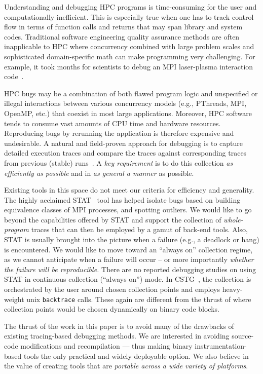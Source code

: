 Understanding and debugging HPC programs 
is time-consuming for the user and computationally inefficient.
%
This is especially true when one has to 
track control flow in terms of function calls and returns that may
span library and system codes. 
%
Traditional software engineering quality assurance methods are 
often inapplicable to HPC where concurrency combined with 
large problem scales and sophisticated domain-specific math can make programming 
very challenging. 
%
For example, it took months for scientists to debug an MPI laser-plasma interaction 
code~\cite{hpcdoe}.


HPC bugs may be a combination of both flawed program logic and unspecified or illegal interactions between various concurrency models (e.g., PThreads, MPI, OpenMP, etc.) that coexist in most large applications. Moreover, HPC software tends to consume vast amounts of CPU time and hardware resources. Reproducing bugs by rerunning the application is therefore expensive and undesirable. 
A natural and field-proven approach for debugging is to capture detailed execution traces and compare the traces against corresponding traces from previous (stable) runs~\cite{stat,cstg}.
%
A {\em key requirement} is to do this collection {\em as efficiently as possible}
and in {\em as general a manner} as possible.


Existing tools in this space
do not meet our criteria for efficiency and generality.
%
The highly acclaimed STAT~\cite{stat} tool has helped isolate
bugs based on building equivalence classes of MPI processes, and spotting
outliers.
%
We would like to go beyond the capabilities offered by STAT and support
the collection of {\em whole-program} traces that can then be employed
by a  gamut of back-end tools.
%
Also, STAT is usually brought into the picture
when a failure (e.g., a deadlock or hang) is encountered. We would like
to move toward an ``always on'' collection regime, as we cannot anticipate
when a failure will occur -- or more importantly {\em whether the failure
will be reproducible.}
%
There are no reported debugging studies on using STAT in
continuous collection (``always on'') mode.
%
In CSTG~\cite{cstg}, the collection is orchestrated by the
user around chosen collection points and employs heavy-weight
unix {\tt backtrace} calls.
%
These again are different from the thrust of \parlot where collection points would be chosen dynamically on binary code blocks.


The thrust of the work in this paper is to avoid many of the drawbacks of existing
tracing-based debugging methods.
%
We are interested in avoiding
source-code modifications and recompilation --- thus making binary
instrumentation-based tools the only practical and widely deployable option.
%
We also believe in the value
of creating tools that are {\em portable across a 
wide variety of platforms}.
%

